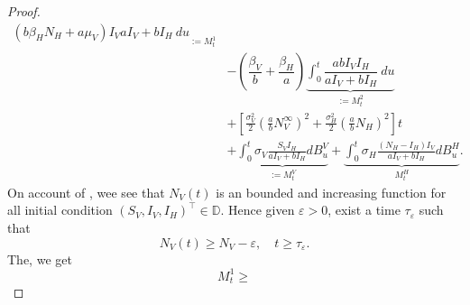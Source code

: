 \begin{proof}
\begin{equation}
\begin{aligned}
{{                            \left(
                                b \beta_H N_H + a \mu_V
                            \right) I_V
                        }{a I_V + bI_H}
                        \ d u
                }_{:= M_t^1}
                \\
                &-
                \left(
                    \dfrac{\beta_V}{b}
                    +
                    \dfrac{\beta_H}{a}
                \right)
                \underbrace{
                    \int_{0} ^ t
                        \dfrac{
                            a b I_V I_H
                            }{
                                a I_V + b I_H
                            }
                    \ du
                }_{:= M_t^2}
                \\
                & +
                \left[
                    \frac{\sigma_V ^ 2}{2}
                    \left(
                        \frac{a}{b} N_V ^ \infty
                    \right) ^2
                    +
                    \frac{\sigma_H ^ 2}{2}
                    \left(
                        \frac{a}{b}
                        N_H
                    \right) ^ 2
                \right]
                t
                \\
                &
                +
                \underbrace{
                    \int_{0} ^ t
                        \sigma_V
                        \frac{S_V I_H}{a I_V + b I_H}
                    d B_u ^ V
                }_{:= M_t ^ V}
                +
                \underbrace{
                    \int_{0} ^ t
                        \sigma_H 
                        \frac{(N_H - I_H) I_V}{a I_V + b I_H}
                    d B_u ^ H 
                }_{M_t ^ H}.
        \end{aligned}
    \end{equation}
    On account of , wee see that $N_V(t)$ is an
    bounded and increasing function for all initial condition
    $(S_V, I_V, I_H)^ \top  \in \mathbb{D}$. Hence given $\varepsilon >0$, exist
    a time $\tau_\varepsilon$ such that
    $$
        N_V(t) \geq N_V - \varepsilon, \quad t\geq \tau_\varepsilon.
    $$
    The, we get
    \begin{equation} \label{eqn:tau_bound}
        M_t ^ 1 \geq 

\end{equation}
\end{proof}
